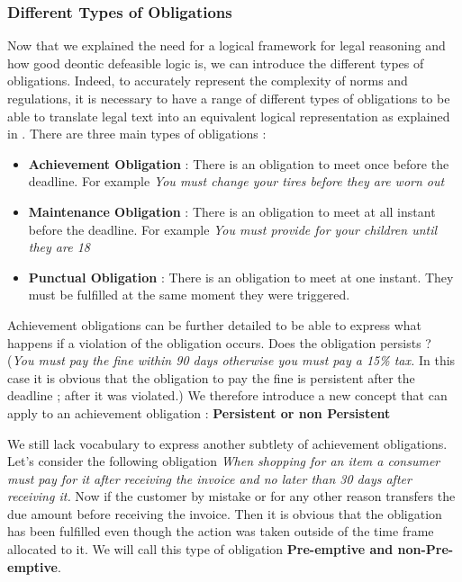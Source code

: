 \documentclass[10pt]{report}
\begin{document}
\subsubsection{Different Types of Obligations}
Now that we explained the need for a logical framework for legal reasoning and how good deontic defeasible logic is, we can introduce the different types of obligations. Indeed, to accurately represent the complexity of norms and regulations, it is necessary to have a range of different types of obligations to be able to translate legal text into an equivalent logical representation as explained in \autocite{ConceptuallyRichModelofBPC}. There are three main types of obligations :
\begin{itemize}
\item \textbf{Achievement Obligation} : There is an obligation to meet once before the deadline. For example \textit{You must change your tires before they are worn out}
\item \textbf{Maintenance Obligation} : There is an obligation to meet at all instant before the deadline. For example \textit{You must provide for your children until they are 18}
\item \textbf{Punctual Obligation} : There is an obligation to meet at one instant. They must be fulfilled at the same moment they were triggered.
\end{itemize}

Achievement obligations can be further detailed to be able to express what happens if a violation of the obligation occurs. Does the obligation persists ? (\textit{You must pay the fine within 90 days otherwise you must pay a 15\% tax.} In this case it is obvious that the obligation to pay the fine is persistent after the deadline ; after it was violated.) We therefore introduce a new concept that can apply to an achievement obligation : \textbf{Persistent or non Persistent}

We still lack vocabulary to express another subtlety of achievement obligations. Let's consider the following obligation \textit{When shopping for an item a consumer must pay for it after receiving the invoice and no later than 30 days after receiving it.} Now if the customer by mistake or for any other reason transfers the due amount before receiving the invoice. Then it is obvious that the obligation has been fulfilled even though the action was taken outside of the time frame allocated to it. We will call this type of obligation \textbf{Pre-emptive and non-Pre-emptive}. 
\end{document}

